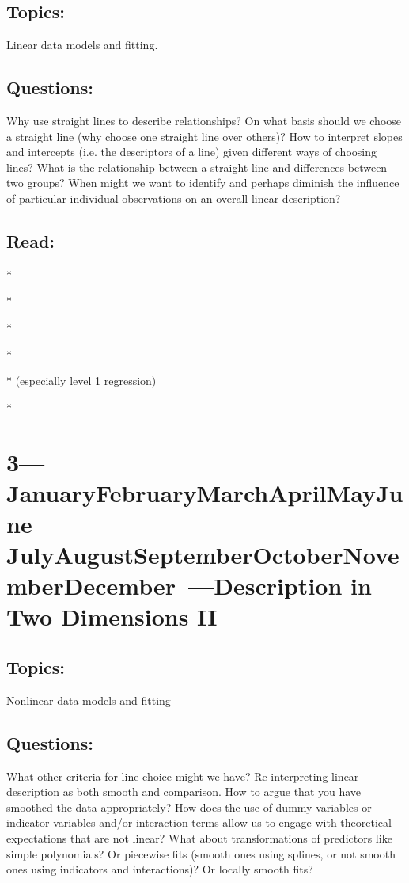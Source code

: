 \documentclass[10pt]{article}
\def\themonth{\ifcase\month\or
	January\or February\or March\or April\or May\or June\or
	July\or August\or September\or October\or November\or December\fi}
\begin{document}
\subsection{Topics:}  Linear data models and fitting.

\subsection{Questions:} Why use straight lines to describe relationships? On
what basis should we choose a straight line (why choose one straight line over
others)? How to interpret slopes and intercepts (i.e. the descriptors of a
line) given different ways of choosing lines? What is the relationship between
a straight line and differences between two groups? When might we want to
identify and perhaps diminish the influence of particular individual
observations on an overall linear description?

\subsection{Read:}

*\citealp[Chap 2]{achen82}

*\citealp[Chap 4,5--8]{kaplan2012ism}

*\citealp[Chap 2--3]{james2013introduction}

*\citealp[Chap 1]{berk2008statistical}

*\citealp{berk2010you} (especially level 1 regression)

*\citealp[Chap 5 and 10]{wilcox2012introduction}

\AdvanceDate[7]
\section{3---\themonth~\the\day---Description in Two Dimensions II}

\subsection{Topics:} Nonlinear data models and fitting

\subsection{Questions:} What other criteria for line choice might we have?
Re-interpreting linear description as both smooth and comparison. How to argue
that you have smoothed the data appropriately? How does the use of dummy
variables or indicator variables and/or interaction terms allow us to engage
with theoretical expectations that are not linear? What about transformations
of predictors like simple polynomials? Or piecewise fits (smooth ones using
splines, or not smooth ones using indicators and interactions)? Or locally
smooth fits?
\end{document}
